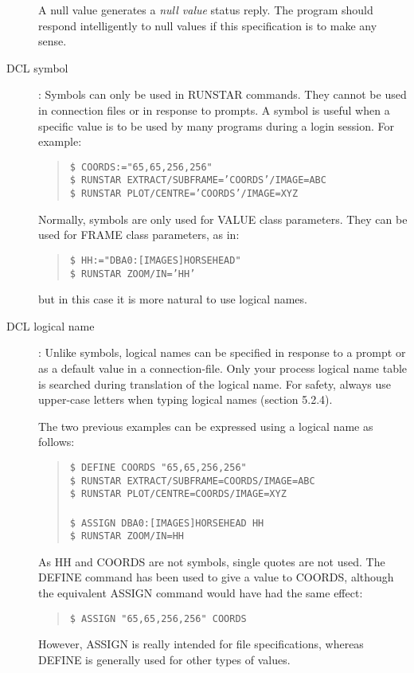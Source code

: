 \begin{description}
A null value generates a {\em null value} status reply.
The program should respond intelligently to null values if this specification
is to make any sense.
\item [DCL symbol]:
Symbols can only be used in RUNSTAR commands.
They cannot be used in connection files or in response to prompts.
A symbol is useful when a specific value is to be used by many programs during
a login session.
For example:
\begin{quote}
{\tt \$ COORDS:="65,65,256,256"\\
\$ RUNSTAR EXTRACT/SUBFRAME='COORDS'/IMAGE=ABC\\
\$ RUNSTAR PLOT/CENTRE='COORDS'/IMAGE=XYZ}
\end{quote}
Normally, symbols are only used for VALUE class parameters.
They can be used for FRAME class parameters, as in:
\begin{quote}
{\tt \$ HH:="DBA0:[IMAGES]HORSEHEAD"\\
\$ RUNSTAR ZOOM/IN='HH'}
\end{quote}
but in this case it is more natural to use logical names.
\item [DCL logical name]:
Unlike symbols, logical names can be specified in response to a prompt
or as a default value in a connection-file.
Only your process logical name table is searched during translation
of the logical name.
For safety, always use upper-case letters when typing logical names
(section 5.2.4).

The two previous examples can be expressed using a logical name as follows:
\begin{quote}
{\tt \$ DEFINE COORDS "65,65,256,256"\\
\$ RUNSTAR EXTRACT/SUBFRAME=COORDS/IMAGE=ABC\\
\$ RUNSTAR PLOT/CENTRE=COORDS/IMAGE=XYZ\\
\\
\$ ASSIGN  DBA0:[IMAGES]HORSEHEAD  HH\\
\$ RUNSTAR ZOOM/IN=HH}
\end{quote}
As HH and COORDS are not symbols, single quotes are not used.
The DEFINE command has been used to give a value to COORDS, although
the equivalent ASSIGN command would have had the same effect:
\begin{quote}
{\tt \$ ASSIGN "65,65,256,256" COORDS}
\end{quote}
However, ASSIGN is really intended for file specifications, whereas DEFINE
is generally used for other types of values.
\end{description}
